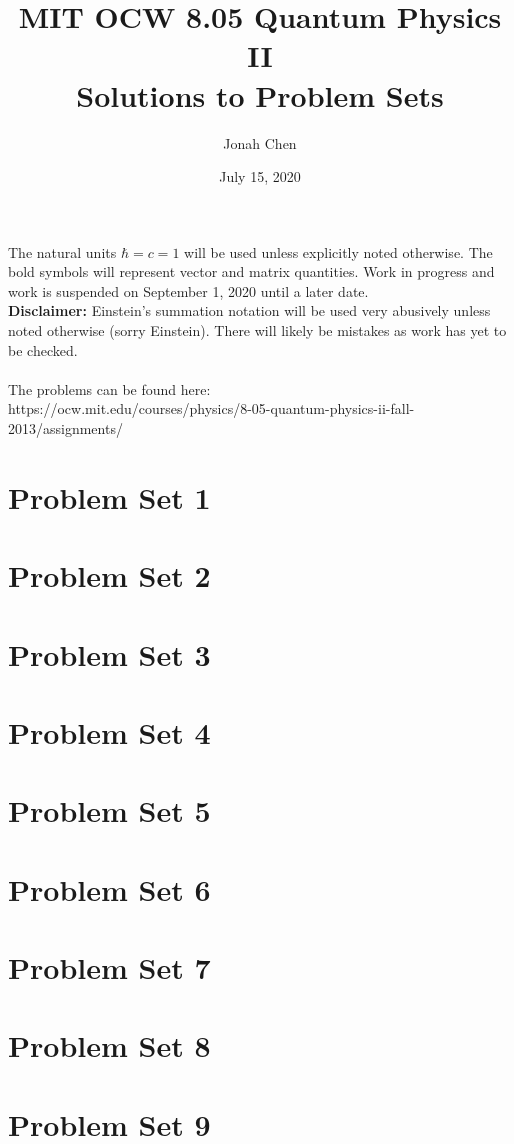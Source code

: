 \documentclass[12pt]{article}
\title{MIT OCW 8.05 Quantum Physics II \\ Solutions to Problem Sets}
\author{Jonah Chen}
\date{July 15, 2020}
\begin{document}
\maketitle
\noindent The natural units $\hbar=c=1$ will be used unless explicitly noted otherwise. The bold symbols will represent vector and matrix quantities. Work in progress and work is suspended on September 1, 2020 until a later date. \\\textbf{Disclaimer:} Einstein's summation notation will be used very abusively unless noted otherwise (sorry Einstein). There will likely be mistakes as work has yet to be checked.\\\\The problems can be found here:\\https://ocw.mit.edu/courses/physics/8-05-quantum-physics-ii-fall-2013/assignments/
\tableofcontents


\newpage
\section{Problem Set 1}
	
	
	
    
    
    
    
\newpage
\section{Problem Set 2}
    
    
    
    
    
    
\newpage    
\section{Problem Set 3}
	
    
    
    
    
    
\newpage
\section{Problem Set 4}
	
    
    
    
    
    
    
\newpage    
\section{Problem Set 5}









\newpage
\section{Problem Set 6}







\section{Problem Set 7}




\newpage



\newpage
\section{Problem Set 8}






\section{Problem Set 9}


\end{document}
